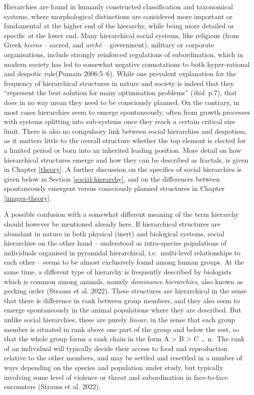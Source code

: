 \documentclass[
  12pt,
]{book}
\begin{document}
Hierarchies are found in humanly constructed classification and taxonomical systems, where morphological distinctions are considered more important or fundamental at the higher end of the hierarchy, while being more detailed or specific at the lower end. Many hierarchical social systems, like religious (from Greek \emph{hieros} -- sacred, and \emph{archê} -- government), military or corporate organisations, include strongly reinforced regulations of subordination, which in modern society has led to somewhat negative connotations to both hyper-rational and despotic rule(Pumain 2006:5--6). While one prevalent explanation for the frequency of hierarchical structures in nature and society is indeed that they ``represent the best solution for many optimisation problems'' (\emph{ibid}. p.7), that does in no way mean they need to be consciously planned. On the contrary, in most cases hierarchies seem to emerge spontaneously, often from growth processes with systems splitting into sub-systems once they reach a certain critical size limit. There is also no compulsory link between social hierarchies and despotism, as it matters little to the overall structure whether the top element is elected for a limited period or born into an inherited leading position. More detail on how hierarchical structures emerge and how they can be described as fractals, is given in Chapter \ref{theory}. A further discussion on the specifics of social hierarchies is given below in Section \ref{social-hierarchy}, and on the differences between spontaneously emergent versus consciously planned structures in Chapter \ref{images-theory}.

A possible confusion with a somewhat different meaning of the term hierarchy should however be mentioned already here. If hierarchical structures are abundant in nature in both physical (inert) and biological systems, social hierarchies on the other hand -- understood as intra-species populations of individuals organised in pyramidal hierarchical, i.e.~multi-level relationships to each other -- seems to be almost exclusively found among human groups. At the same time, a different type of hierarchy is frequently described by biologists which is common among animals, namely \emph{dominance hierarchies}, also known as pecking order (Strauss et al. 2022). These structures are hierarchical in the sense that there is difference in rank between group members, and they also seem to emerge spontaneously in the animal populations where they are described. But unlike social hierarchies, these are purely \emph{linear}, in the sense that each group member is situated in rank above one part of the group and below the rest, so that the whole group forms a rank chain in the form A \textgreater{} B \textgreater{} C \ldots{} n.~The rank of an individual will typically decide their access to food and reproduction relative to the other members, and may be settled and resettled in a number of ways depending on the species and population under study, but typically involving some level of violence or threat and subordination in face-to-face encounters (Strauss et al. 2022).
\end{document}
